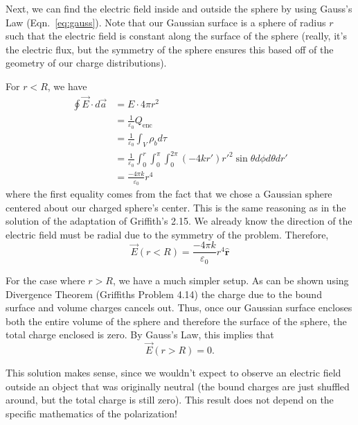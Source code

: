 \documentclass{article}
\newcommand{\rhat}{\hat{\textbf{r}}}
\begin{document}
Next, we can find the electric field inside and outside the sphere by using Gauss's Law (Eqn.~\ref{eq:gauss}). Note that our Gaussian surface is a sphere of radius $r$ such that the electric field is constant along the surface of the sphere (really, it's the electric flux, but the symmetry of the sphere ensures this based off of the geometry of our charge distributions).

For $r<R$, we have
\begin{align}
	\oint\vec{E}\cdot d\vec{a} &= E \cdot 4\pi r^2 \\
	&= \frac{1}{\varepsilon_0} Q_{\textrm{enc}} \nonumber\\
	&= \frac{1}{\varepsilon_0} \int_V \rho_b d\tau \nonumber\\
	&= \frac{1}{\varepsilon_0} \int_0^r \int_0^\pi \int_0^{2\pi} (-4kr') {r'}^2 \sin\theta d\phi d\theta dr' \nonumber\\
	&= \frac{-4\pi k}{\varepsilon_0}r^4 \nonumber
\end{align}
where the first equality comes from the fact that we chose a Gaussian sphere centered about our charged sphere's center. This is the same reasoning as in the solution of the adaptation of Griffith's 2.15. We already know the direction of the electric field must be radial due to the symmetry of the problem. Therefore,
\begin{equation}
	\boxed{\vec{E}(r<R) = \frac{-4\pi k}{\varepsilon_0}r^4\rhat}
\end{equation}

For the case where $r>R$, we have a much simpler setup. As can be shown using Divergence Theorem (Griffiths Problem 4.14) the charge due to the bound surface and volume charges cancels out. Thus, once our Gaussian surface encloses both the entire volume of the sphere and therefore the surface of the sphere, the total charge enclosed is zero. By Gauss's Law, this implies that
\begin{equation}
	\boxed{\vec{E}(r>R) = 0}.
\end{equation}

This solution makes sense, since we wouldn't expect to observe an electric field outside an object that was originally neutral (the bound charges are just shuffled around, but the total charge is still zero). This result does not depend on the specific mathematics of the polarization!
\end{document}
